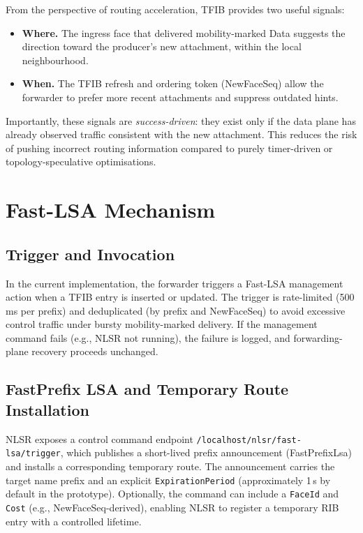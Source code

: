 From the perspective of routing acceleration, TFIB provides two useful signals:

\begin{itemize}
  \item \textbf{Where.} The ingress face that delivered mobility-marked Data suggests the direction toward the producer’s new attachment, within the local neighbourhood.
  \item \textbf{When.} The TFIB refresh and ordering token (NewFaceSeq) allow the forwarder to prefer more recent attachments and suppress outdated hints.
\end{itemize}

Importantly, these signals are \emph{success-driven}: they exist only if the data plane has already observed traffic consistent with the new attachment. This reduces the risk of pushing incorrect routing information compared to purely timer-driven or topology-speculative optimisations.

\section{Fast-LSA Mechanism}
\label{sec:routingacc:fastlsa}

\subsection{Trigger and Invocation}
\label{sec:routingacc:fastlsa-trigger}

In the current implementation, the forwarder triggers a Fast-LSA management action when a TFIB entry is inserted or updated. The trigger is rate-limited (500\,ms per prefix) and deduplicated (by prefix and NewFaceSeq) to avoid excessive control traffic under bursty mobility-marked delivery. If the management command fails (e.g., NLSR not running), the failure is logged, and forwarding-plane recovery proceeds unchanged.

\subsection{FastPrefix LSA and Temporary Route Installation}
\label{sec:routingacc:fastlsa-install}

NLSR exposes a control command endpoint \texttt{/localhost/nlsr/fast-lsa/trigger}, which publishes a short-lived prefix announcement (FastPrefixLsa) and installs a corresponding temporary route. The announcement carries the target name prefix and an explicit \texttt{ExpirationPeriod} (approximately 1\,s by default in the prototype). Optionally, the command can include a \texttt{FaceId} and \texttt{Cost} (e.g., NewFaceSeq-derived), enabling NLSR to register a temporary RIB entry with a controlled lifetime.


